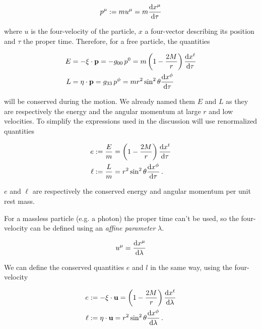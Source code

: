 \begin{equation}
    p^\mu := m u^\mu = m \dv{x^\mu}{\tau}
\end{equation}

where $u$ is the four-velocity of the particle, $x$ a four-vector describing its
position and $\tau$ the
proper time.
Therefore, for a free particle, the quantities

\begin{align*}
    E &= - \mathbf{\xi \cdot p} =
    - g_{00} \, p^0 = m \left( 1 - \frac{2M}{r} \right) \dv{x^t}{\tau} \\
    L &= \mathbf{\eta \cdot p} =
    g_{33} \, p^\phi = m r^2 \sin^2 \theta \dv{x^\phi}{\tau}
\end{align*}

will be conserved during the motion.
We already named them $E$ and $L$ as they are respectively the energy and the
angular momentum at large $r$ and low velocities.
To simplify the expressions used in the discussion will use renormalized
quantities

\begin{subequations}
    \begin{align}
        e &:= \frac{E}{m} = \left( 1 - \frac{2M}{r} \right) \dv{x^t}{\tau}
        \label{cap1:eq:conserved_e} \\
        \ell &:= \frac{L}{m} = r^2 \sin^2 \theta \dv{x^\phi}{\tau} \, .
        \label{cap1:eq:conserved_l}
    \end{align}
\end{subequations}

$e$ and $\ell$ are respectively the conserved energy and angular momentum per
unit
rest mass.

For a massless particle (e.g. a photon) the proper time can't be used, so
the four-velocity can be defined using an \textit{affine parameter} $\lambda$.

\begin{equation}
    u^\mu = \dv{x^\mu}{\lambda}
    \label{cap1:eq:u_light}
\end{equation}

We can define the conserved quantities $e$ and $l$ in the same way, using the
four-velocity

\begin{subequations}
    \begin{align}
        e &:= - \xi \cdot \mathbf{u}
        = \left( 1 - \frac{2M}{r} \right) \dv{x^t}{\lambda} \\
        \ell &:= \eta \cdot \mathbf{u} 
        = r^2 \sin^2 \theta \dv{x^\phi}{\lambda} \, .
        \label{cap1:eq:e_light}
    \end{align}
    \label{cap1:eq:conserved_light}    
\end{subequations}

